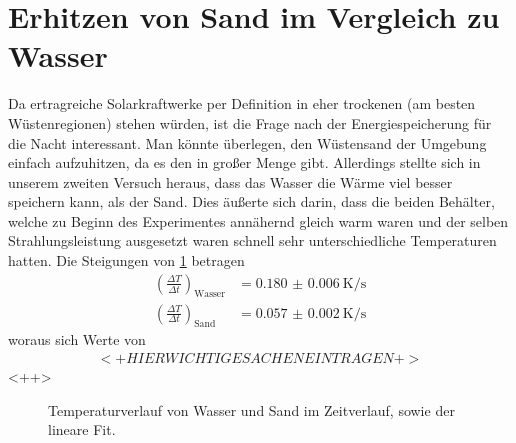 \documentclass[12pt,a4paper,titlepage,headinclude,bibtotoc]{scrartcl}
\begin{document}
\section{Erhitzen von Sand im Vergleich zu Wasser}
Da ertragreiche Solarkraftwerke per Definition in eher trockenen (am besten Wüstenregionen) stehen würden, ist die Frage nach der Energiespeicherung für die Nacht interessant.
Man könnte überlegen, den Wüstensand der Umgebung einfach aufzuhitzen, da es den in großer Menge gibt.
Allerdings stellte sich in unserem zweiten Versuch heraus, dass das Wasser die Wärme viel besser speichern kann, als der Sand.
Dies äußerte sich darin, dass die beiden Behälter, welche zu Beginn des Experimentes annähernd gleich warm waren und der selben Strahlungsleistung ausgesetzt waren schnell sehr unterschiedliche Temperaturen hatten.
Die Steigungen von \ref{fig:wassersand} betragen
\begin{align*}
	\left( \frac{\Delta T}{\Delta t} \right)_\text{Wasser}&=\SI{0.180(6)}{\kelvin \per \second}\\
	\left( \frac{\Delta T}{\Delta t} \right)_\text{Sand}&=\SI{0.057(2)}{\kelvin \per \second}
\end{align*}
woraus sich Werte von
\begin{align*}
	<+HIER WICHTIGE SACHEN EINTRAGEN+>	
\end{align*}<++>

\begin{figure}[h]
	\centering
	
	\caption{Temperaturverlauf von Wasser und Sand im Zeitverlauf, sowie der lineare Fit.}
	\label{fig:wassersand}
\end{figure}
\end{document}
